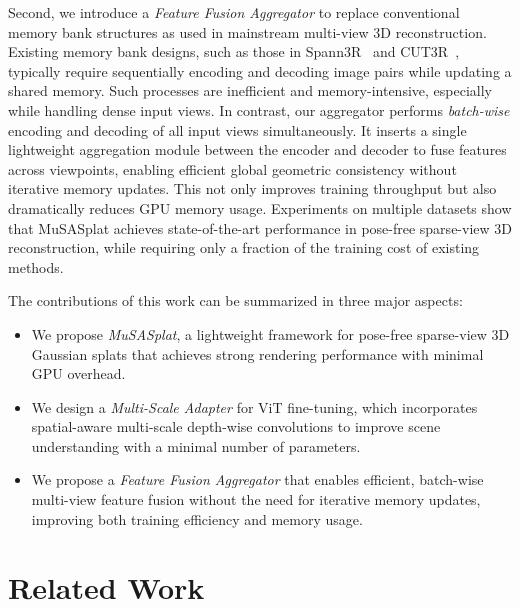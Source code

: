 \documentclass[letterpaper]{article} %
\begin{document}
Second, we introduce a \textit{Feature Fusion Aggregator} to replace conventional memory bank structures as used in mainstream multi-view 3D reconstruction. Existing memory bank designs, such as those in Spann3R~\cite{wang20243d} and CUT3R~\cite{wang2025continuous}, typically require sequentially encoding and decoding image pairs while updating a shared memory. Such processes are inefficient and memory-intensive, especially while handling dense input views. In contrast, our aggregator performs \textit{batch-wise} encoding and decoding of all input views simultaneously. It inserts a single lightweight aggregation module between the encoder and decoder to fuse features across viewpoints, enabling efficient global geometric consistency without iterative memory updates. This not only improves training throughput but also dramatically reduces GPU memory usage.
Experiments on multiple datasets show that MuSASplat achieves state-of-the-art performance in pose-free sparse-view 3D reconstruction, while requiring only a fraction of the training cost of existing methods.

The contributions of this work can be summarized in three major aspects:
\begin{itemize}
    \item We propose \textit{MuSASplat}, a lightweight framework for pose-free sparse-view 3D Gaussian splats that achieves strong rendering performance with minimal GPU overhead.
    \item We design a \textit{Multi-Scale Adapter} for ViT fine-tuning, which incorporates spatial-aware multi-scale depth-wise convolutions to improve scene understanding with a minimal number of parameters.
    \item We propose a \textit{Feature Fusion Aggregator} that enables efficient, batch-wise multi-view feature fusion without the need for iterative memory updates, improving both training efficiency and memory usage.
\end{itemize}

\section{Related Work}
\label{sec:related_work}
\end{document}
